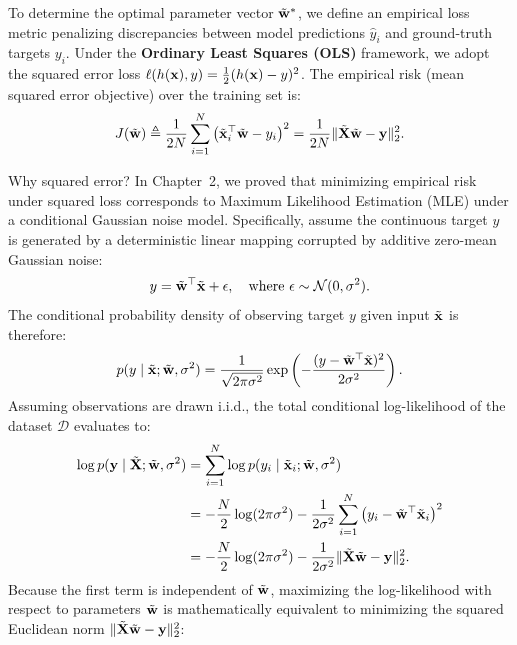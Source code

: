 To determine the optimal parameter vector $\tilde{\mathbf{w}}^*$, we define an empirical loss metric penalizing discrepancies between model predictions $\hat{y}_i$ and ground-truth targets $y_i$. Under the \textbf{Ordinary Least Squares (OLS)} framework, we adopt the squared error loss $\ell(h(\mathbf{x}), y) = \frac{1}{2}(h(\mathbf{x}) - y)^2$. The empirical risk (mean squared error objective) over the training set is:
\begin{equation}
J(\tilde{\mathbf{w}}) \triangleq \frac{1}{2N} \sum_{i=1}^N \left( \tilde{\mathbf{x}}_i^\top \tilde{\mathbf{w}} - y_i \right)^2 = \frac{1}{2N} \|\tilde{\mathbf{X}}\tilde{\mathbf{w}} - \mathbf{y}\|_2^2.
\label{eq:ols_empirical_risk}
\end{equation}

\begin{deepdive}
Why squared error? In Chapter~2, we proved that minimizing empirical risk under squared loss corresponds to Maximum Likelihood Estimation (MLE) under a conditional Gaussian noise model. Specifically, assume the continuous target $y$ is generated by a deterministic linear mapping corrupted by additive zero-mean Gaussian noise:
\begin{equation}
y = \tilde{\mathbf{w}}^\top \tilde{\mathbf{x}} + \epsilon, \quad \text{where } \epsilon \sim \mathcal{N}(0, \sigma^2).
\label{eq:gaussian_noise_model}
\end{equation}
The conditional probability density of observing target $y$ given input $\tilde{\mathbf{x}}$ is therefore:
\begin{equation}
p(y \mid \tilde{\mathbf{x}}; \tilde{\mathbf{w}}, \sigma^2) = \frac{1}{\sqrt{2\pi \sigma^2}} \exp\left( -\frac{(y - \tilde{\mathbf{w}}^\top \tilde{\mathbf{x}})^2}{2\sigma^2} \right).
\label{eq:conditional_gaussian_density}
\end{equation}
Assuming observations are drawn i.i.d., the total conditional log-likelihood of the dataset $\mathcal{D}$ evaluates to:
\begin{align}
\log p(\mathbf{y} \mid \tilde{\mathbf{X}}; \tilde{\mathbf{w}}, \sigma^2) &= \sum_{i=1}^N \log p(y_i \mid \tilde{\mathbf{x}}_i; \tilde{\mathbf{w}}, \sigma^2) \nonumber \\
&= -\frac{N}{2} \log(2\pi\sigma^2) - \frac{1}{2\sigma^2} \sum_{i=1}^N \left( y_i - \tilde{\mathbf{w}}^\top \tilde{\mathbf{x}}_i \right)^2 \nonumber \\
&= -\frac{N}{2} \log(2\pi\sigma^2) - \frac{1}{2\sigma^2} \|\tilde{\mathbf{X}}\tilde{\mathbf{w}} - \mathbf{y}\|_2^2.
\label{eq:log_likelihood_ols}
\end{align}
Because the first term is independent of $\tilde{\mathbf{w}}$, maximizing the log-likelihood with respect to parameters $\tilde{\mathbf{w}}$ is mathematically equivalent to minimizing the squared Euclidean norm $\|\tilde{\mathbf{X}}\tilde{\mathbf{w}} - \mathbf{y}\|_2^2$:

\end{deepdive}
